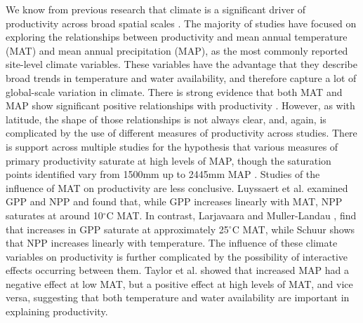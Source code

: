 \documentclass[]{article}
\begin{document}
We know from previous research that climate is a significant driver of
productivity across broad spatial scales
\citep{cleveland_relationships_2011}. The majority of studies have
focused on exploring the relationships between productivity and mean
annual temperature (MAT) and mean annual precipitation (MAP), as the
most commonly reported site-level climate variables. These variables
have the advantage that they describe broad trends in temperature and
water availability, and therefore capture a lot of global-scale
variation in climate. There is strong evidence that both MAT and MAP
show significant positive relationships with productivity
\citep{chu_does_2016}. However, as with latitude, the shape of those
relationships is not always clear, and, again, is complicated by the use
of different measures of productivity across studies. There is support
across multiple studies for the hypothesis that various measures of
primary productivity saturate at high levels of MAP, though the
saturation points identified vary from 1500mm \citep{luyssaert_co_2007}
up to 2445mm MAP \citep{schuur_productivity_2003}. Studies of the
influence of MAT on productivity are less conclusive. Luyssaert et al.
\citeyearpar{luyssaert_co_2007} examined GPP and NPP and found that,
while GPP increases linearly with MAT, NPP saturates at around
10\(^\circ\)C MAT. In contrast, Larjavaara and Muller-Landau
\citeyearpar{larjavaara_temperature_2012}, find that increases in GPP
saturate at approximately 25\(^\circ\)C MAT, while Schuur
\citeyearpar{schuur_productivity_2003} shows that NPP increases linearly
with temperature. The influence of these climate variables on
productivity is further complicated by the possibility of interactive
effects occurring between them. Taylor et al.
\citeyearpar{taylor_temperature_2017} showed that increased MAP had a
negative effect at low MAT, but a positive effect at high levels of MAT,
and vice versa, suggesting that both temperature and water availability
are important in explaining productivity.
\end{document}
